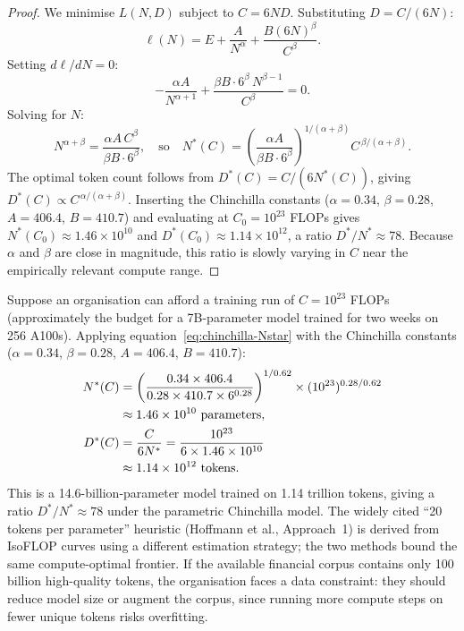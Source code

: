 \begin{deepdive}
\begin{proof}
We minimise $L(N, D)$ subject to $C = 6ND$.  Substituting $D = C/(6N)$:
\begin{equation}
  \ell(N) = E + \frac{A}{N^\alpha} + \frac{B(6N)^\beta}{C^\beta}.
  \label{eq:chinchilla-substituted}
\end{equation}
Setting $d\ell/dN = 0$:
\begin{equation}
  -\frac{\alpha A}{N^{\alpha+1}} + \frac{\beta B \cdot 6^\beta \, N^{\beta-1}}{C^\beta} = 0.
  \label{eq:chinchilla-foc}
\end{equation}
Solving for $N$:
\begin{equation}
  N^{\alpha+\beta} = \frac{\alpha A \, C^\beta}{\beta B \cdot 6^\beta},
  \quad\text{so}\quad
  N^*(C) = \left(\frac{\alpha A}{\beta B \cdot 6^\beta}\right)^{1/(\alpha+\beta)}
            C^{\,\beta/(\alpha+\beta)}.
  \label{eq:chinchilla-Nstar}
\end{equation}
The optimal token count follows from $D^*(C) = C/(6N^*(C))$, giving
$D^*(C) \propto C^{\,\alpha/(\alpha+\beta)}$.
Inserting the Chinchilla constants ($\alpha = 0.34$, $\beta = 0.28$,
$A = 406.4$, $B = 410.7$) and evaluating at $C_0 = 10^{23}$ FLOPs gives
$N^*(C_0) \approx 1.46 \times 10^{10}$ and $D^*(C_0) \approx 1.14 \times 10^{12}$,
a ratio $D^*/N^* \approx 78$.  Because $\alpha$ and $\beta$ are close in
magnitude, this ratio is slowly varying in $C$ near the empirically relevant
compute range.
\end{proof}

\begin{example}
\label{ex:chinchilla-finance}
Suppose an organisation can afford a training run of $C = 10^{23}$ FLOPs
(approximately the budget for a 7B-parameter model trained for two weeks on
256 A100s).  Applying equation~\eqref{eq:chinchilla-Nstar} with the Chinchilla
constants ($\alpha = 0.34$, $\beta = 0.28$, $A = 406.4$, $B = 410.7$):
\begin{align}
  N^*(C) &= \left(\frac{0.34 \times 406.4}{0.28 \times 410.7 \times 6^{0.28}}\right)^{1/0.62}
           \times (10^{23})^{0.28/0.62} \notag \\
         &\approx 1.46 \times 10^{10} \text{ parameters}, \label{eq:ex-nstar} \\
  D^*(C) &= \frac{C}{6 N^*} = \frac{10^{23}}{6 \times 1.46 \times 10^{10}} \notag \\
         &\approx 1.14 \times 10^{12} \text{ tokens}. \label{eq:ex-dstar}
\end{align}
This is a 14.6-billion-parameter model trained on 1.14 trillion tokens, giving a
ratio $D^*/N^* \approx 78$ under the parametric Chinchilla model.  The widely
cited ``20 tokens per parameter'' heuristic (Hoffmann et al., Approach~1) is
derived from IsoFLOP curves using a different estimation strategy; the two
methods bound the same compute-optimal frontier.  If the available
financial corpus contains only 100 billion high-quality tokens, the organisation
faces a data constraint: they should reduce model size or augment the corpus,
since running more compute steps on fewer unique tokens risks overfitting.
\end{example}


\end{deepdive}
